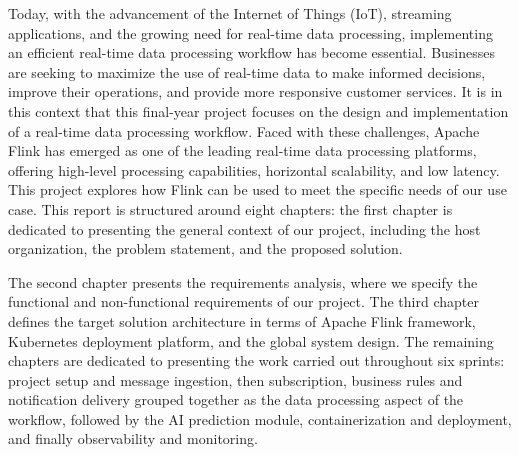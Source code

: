 
Today, with the advancement of the Internet of Things (IoT), streaming applications, and the growing need for real-time data processing, implementing an efficient real-time data processing workflow has become essential. Businesses are seeking to maximize the use of real-time data to make informed decisions, improve their operations, and provide more responsive customer services. It is in this context that this final-year project focuses on the design and implementation of a real-time data processing workflow. Faced with these challenges, Apache Flink has emerged as one of the leading real-time data processing platforms, offering high-level processing capabilities, horizontal scalability, and low latency. This project explores how Flink can be used to meet the specific needs of our use case.
This report is structured around eight chapters: the first chapter is dedicated to presenting the general context of our project, including the host organization, the problem statement, and the proposed solution.

The second chapter presents the requirements analysis, where we specify the functional and non-functional requirements of our project.
The third chapter defines the target solution architecture in terms of Apache Flink framework, Kubernetes deployment platform, and the global system design.
The remaining chapters are dedicated to presenting the work carried out throughout six sprints: project setup and message ingestion, then subscription, business rules and notification delivery grouped together as the data processing aspect of the workflow, followed by the AI prediction module, containerization and deployment, and finally observability and monitoring.
